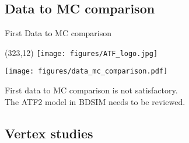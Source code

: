 \documentclass[xcolor={dvipsnames}]{beamer}
\newcommand{\ATFlogo}{
  \setlength{\TPHorizModule}{1pt}
  \setlength{\TPVertModule}{1pt}
  \begin{textblock}{1}(323,12)
   \texttt{[image: figures/ATF\_logo.jpg]}
  \end{textblock}
}
\begin{document}
\subsection{Data to MC comparison}
\begin{frame}{First Data to MC comparison}
\ATFlogo
\begin{center}
\texttt{[image: figures/data\_mc\_comparison.pdf]}
\end{center}
First data to MC comparison is not satisfactory.\\
The ATF2 model in BDSIM needs to be reviewed.
\end{frame}

\subsection{Vertex studies}
\end{document}

